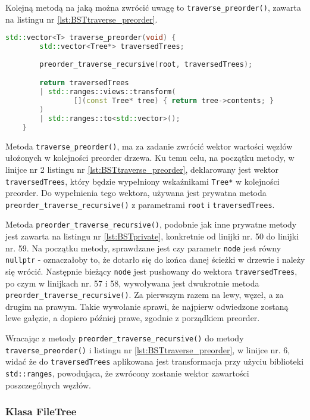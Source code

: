 Kolejną metodą na jaką można zwrócić uwagę to \texttt{traverse\_preorder()}, zawarta na listingu nr \ref{lst:BSTtraverse_preorder}. 

\begin{lstlisting}[caption=Metoda \texttt{add()}, label={lst:BSTtraverse_preorder}, language=C++]
	std::vector<T> traverse_preorder(void) {
		std::vector<Tree*> traversedTrees;
	
		preorder_traverse_recursive(root, traversedTrees);

		return traversedTrees 
		| std::ranges::views::transform(
				[](const Tree* tree) { return tree->contents; }
		) 
		| std::ranges::to<std::vector>(); 
	}

\end{lstlisting}

Metoda \texttt{traverse\_preorder()}, ma za zadanie zwrócić wektor wartości węzłów ułożonych w kolejności preorder drzewa. Ku temu celu, na początku metody, w linijce nr 2 listingu nr \ref{lst:BSTtraverse_preorder}, deklarowany jest wektor \texttt{traversedTrees}, który będzie wypełniony wskaźnikami \texttt{Tree*} w kolejności preorder. Do wypełnienia tego wektora, używana jest prywatna metoda \texttt{preorder\_traverse\_recursive()} z parametrami \texttt{root} i \texttt{traversedTrees}.

Metoda \texttt{preorder\_traverse\_recursive()}, podobnie jak inne prywatne metody jest zawarta na listingu nr \ref{lst:BSTprivate}, konkretnie od linijki nr. 50 do linijki nr. 59. Na początku metody, sprawdzane jest czy parametr \texttt{node} jest równy \texttt{nullptr} - oznaczałoby to, że dotarło się do końca danej ścieżki w drzewie i należy się wrócić. Następnie bieżący \texttt{node} jest pushowany do wektora \texttt{traversedTrees}, po czym w linijkach nr. 57 i 58, wywoływana jest dwukrotnie metoda \texttt{preorder\_traverse\_recursive()}. Za pierwszym razem na lewy, węzeł, a za drugim na prawym. Takie wywołanie sprawi, że najpierw odwiedzone zostaną lewe gałęzie, a dopiero później prawe, zgodnie z porządkiem preorder.

Wracając z metody \texttt{preorder\_traverse\_recursive()} do metody \texttt{traverse\_preorder()} i listingu nr \ref{lst:BSTtraverse_preorder}, w linijce nr. 6, widać że do \texttt{traversedTrees} aplikowana jest transformacja przy użyciu biblioteki \texttt{std::ranges}, powodująca, że zwrócony zostanie wektor zawartości poszczególnych węzłów.

\subsubsection{Klasa FileTree} 


